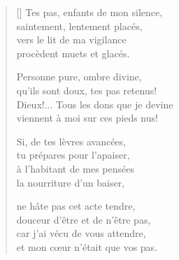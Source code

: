 {\itshape
\begin{verse}[\versewidth]
  Tes pas, enfants de mon silence, \\
  saintement, lentement placés, \\
  vers le lit de ma vigilance \\
  procèdent muets et glacés.

  Personne pure, ombre divine, \\
  qu'ils sont doux, tes pas retenus! \\
  Dieux!... Tous les dons que je devine \\
  viennent à moi sur ces pieds nus!

  Si, de tes lèvres avancées, \\
  tu prépares pour l'apaiser, \\
  à l'habitant de mes pensées \\
  la nourriture d'un baiser,

  ne hâte pas cet acte tendre, \\
  douceur d'être et de n'être pas, \\
  car j'ai vécu de vous attendre, \\
  et mon cœur n'était que vos pas.
\end{verse}
}
